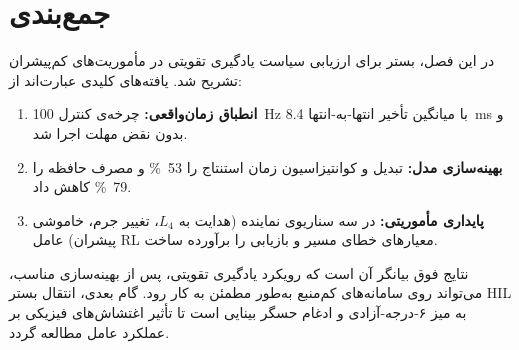 \section{جمع‌بندی}\label{sec:hil_conclusion}

در این فصل، بستر  برای ارزیابی سیاست یادگیری تقویتی در مأموریت‌های کم‌پیشران تشریح شد. یافته‌های کلیدی عبارت‌اند از:

\begin{enumerate}
	\item \textbf{انطباق زمان‌واقعی:} چرخه‌ی کنترل \SI{100}{\hertz} با میانگین تأخیر انتها‑به‑انتها \SI{8.4}{\milli\second} و بدون نقض مهلت اجرا شد. 
	\item \textbf{بهینه‌سازی مدل:} تبدیل  و کوانتیزاسیون  زمان استنتاج را \SI{53}{\percent} و مصرف حافظه را \SI{79}{\percent} کاهش داد.
	\item \textbf{پایداری مأموریتی:} در سه سناریوی نماینده (هدایت به $L_4$، تغییر جرم، خاموشی پیشران) عامل RL معیارهای خطای مسیر و بازیابی را برآورده ساخت.
\end{enumerate}

نتایج فوق بیانگر آن است که رویکرد یادگیری تقویتی، پس از بهینه‌سازی مناسب، می‌تواند روی سامانه‌های کم‌منبع به‌طور مطمئن به کار رود. گام بعدی، انتقال بستر HIL به میز ۶‑درجه‑آزادی  و ادغام حسگر بینایی است تا تأثیر اغتشاش‌های فیزیکی بر عملکرد عامل مطالعه گردد.
